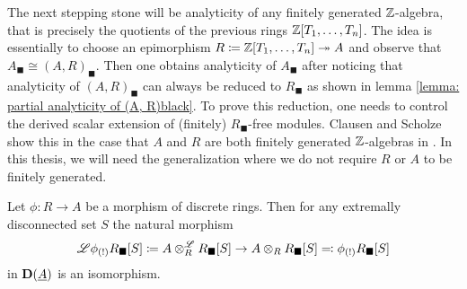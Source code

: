 The next stepping stone will be analyticity of any finitely generated ${\mathbb{Z}}$-algebra, that is precisely the quotients of the previous rings ${\mathbb{Z}}[T_1,\dots, T_n]$. The idea is essentially to choose an epimorphism $R\coloneqq{\mathbb{Z}}[T_1, \dots, T_n] \twoheadrightarrow A$ and observe that $A_\blacksquare\cong (A, R)_\blacksquare$. Then one obtains analyticity of $A_\blacksquare$ after noticing that analyticity of $(A, R)_\blacksquare$ can always be reduced to $R_\blacksquare$ as shown in lemma \ref{lemma: partial analyticity of (A, R)black}. To prove this reduction, one needs to control the derived scalar extension of (finitely) $R_\blacksquare$-free modules. Clausen and Scholze show this in the case that $A$ and $R$ are both finitely generated ${\mathbb{Z}}$-algebras in \cite[Intro. Appendix to Lec. VIII]{condenseddotpdf}. In this thesis, we will need the generalization where we do not require $R$ or $A$ to be finitely generated.
\begin{lemma}
	\label{lemma: derived scalar extension is concentrated in degree 0}
	
	Let $\phi\colon R\to A$ be a morphism of discrete rings. Then for any extremally disconnected set $S$ the natural morphism
		$$\mathscr{L}{\phi_{(!)}}{R_\blacksquare[S]}\coloneqq A\otimes^{\mathscr{L}}_R {R_\blacksquare[S]}\to A\otimes_R {R_\blacksquare[S]} \eqqcolon {\phi_{(!)}}{R_\blacksquare[S]}$$
	in ${{\mathbf{D}}(\underline{A})}$ is an isomorphism.
\end{lemma}
